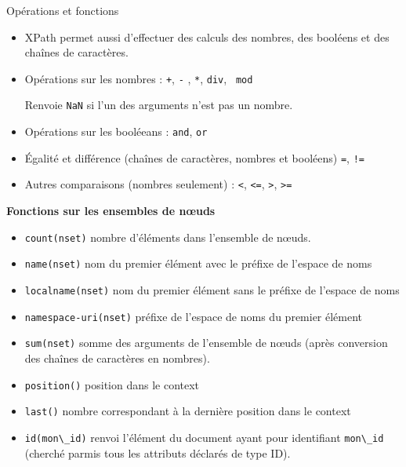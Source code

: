 \begin{frame}[allowframebreaks]{Op\'erations et fonctions}

\begin{itemize}
\item XPath permet aussi d'effectuer des calculs des nombres, des bool\'eens et des cha\^{i}nes de caract\`eres.

\item Op\'erations sur les nombres : \verb?+?, \verb?-? , \verb?*?, \verb?div?, \verb? mod?\\ 

Renvoie \verb?NaN? si l'un des arguments n'est pas un nombre. 

\item Op\'erations sur les bool\'eeans : \verb?and?, \verb?or?

\item \'Egalit\'e et diff\'erence (cha\^{i}nes de caract\`eres, nombres et bool\'eens)  \verb?=?, \verb?!=? 

\item Autres comparaisons (nombres seulement) : \verb?<?, \verb?<=?, \verb?>?, \verb?>= ?

\end{itemize}

\framebreak

{\bf Fonctions sur les ensembles de n{\oe}uds}
\begin{itemize}
\item \verb?count(nset)? nombre d'\'el\'ements dans l'ensemble de n{\oe}uds. 
\item \verb?name(nset)? nom du premier \'el\'ement avec le pr\'efixe de l'espace de noms
\item \verb?localname(nset)? nom du premier \'el\'ement sans le pr\'efixe de l'espace de noms
\item \verb?namespace-uri(nset)? pr\'efixe de l'espace de noms du premier \'el\'ement 
\item \verb?sum(nset)? somme des arguments de l'ensemble de n{\oe}uds (apr\`es conversion des cha\^{i}nes de caract\`eres en nombres).
\item \verb?position()? position dans le context
\item \verb?last()? nombre correspondant à la derni\`ere position dans le context
\item \verb?id(mon\_id)? renvoi l'\'el\'ement du document ayant pour identifiant \verb?mon\_id? (cherch\'e parmis tous les attributs d\'eclar\'es de type ID).
\end{itemize}


\end{frame}
